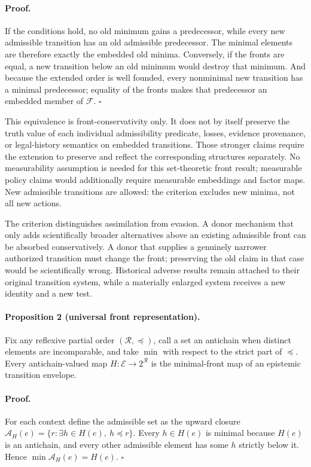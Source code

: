 \paragraph{Proof.}
If the conditions hold, no old minimum gains a predecessor, while every new
admissible transition has an old admissible predecessor. The minimal elements
are therefore exactly the embedded old minima. Conversely, if the fronts are
equal, a new transition below an old minimum would destroy that minimum. And
because the extended order is well founded, every nonminimal new transition
has a minimal predecessor; equality of the fronts makes that predecessor an
embedded member of $\mathcal F$. \hfill$\square$

This equivalence is front-conservativity only. It does not by itself preserve
the truth value of each individual admissibility predicate, losses, evidence
provenance, or legal-history semantics on embedded transitions. Those stronger
claims require the extension to preserve and reflect the corresponding
structures separately. No measurability assumption is needed for this
set-theoretic front result; measurable policy claims would additionally require
measurable embeddings and factor maps. New admissible transitions are allowed:
the criterion excludes new minima, not all new actions.

The criterion distinguishes assimilation from evasion. A donor mechanism that
only adds scientifically broader alternatives above an existing admissible
front can be absorbed conservatively. A donor that supplies a genuinely
narrower authorized transition must change the front; preserving the old claim
in that case would be scientifically wrong. Historical adverse results remain
attached to their original transition system, while a materially enlarged
system receives a new identity and a new test.

\paragraph{Proposition 2 (universal front representation).}
Fix any reflexive partial order $(\mathcal R,\preceq)$, call a set an
antichain when distinct elements are incomparable, and take $\min$ with
respect to the strict part of $\preceq$. Every antichain-valued map
$H:\mathcal E\to 2^{\mathcal R}$ is the minimal-front map of an epistemic
transition envelope.

\paragraph{Proof.}
For each context define the admissible set as the upward closure
$\mathcal A_H(e)=\{r:\exists h\in H(e),\ h\preceq r\}$. Every $h\in H(e)$ is
minimal because $H(e)$ is an antichain, and every other admissible element has
some $h$ strictly below it. Hence $\min\mathcal A_H(e)=H(e)$. \hfill$\square$

